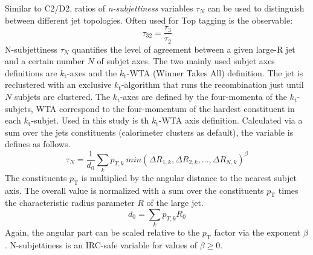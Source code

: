 Similar to C2/D2, ratios of \textit{n-subjettiness} variables $\tau_N$ can be used to distinguish between different jet topologies. Often used for Top tagging is the observable: 
\begin{equation}
\tau_{32} = \frac{\tau_3}{\tau_2}  
\end{equation} 
N-subjettiness $\tau_N$ quantifies the level of agreement between a given large-R jet and a certain number $N$ of subjet axes. The two mainly used subjet axes definitions are $k_\mathrm{t}$-axes and the $k_\mathrm{t}$-WTA (Winner Takes All) definition. The jet is reclustered with an exclusive $k_\mathrm{t}$-algorithm that runs the recombination just until $N$ subjets are clustered. The $k_\mathrm{t}$-axes are defined by the four-momenta of the $k_\mathrm{t}$-subjets, WTA correspond to the four-momentum of the hardest constituent in each $k_\mathrm{t}$-subjet. Used in this study is th $k_\mathrm{t}$-WTA axis definition. Calculated via a sum over the jets constituents (calorimeter clusters as default), the variable is defines as follows.
\begin{equation}
\tau_N = \frac{1}{d_0}\sum_k p_{T,k}\:min(\Delta R_{1,k},\Delta R_{2,k},...,\Delta R_{N,k})^{\beta}
\end{equation}
The constituents $p_{\mathrm{T}}$ is multiplied by the angular distance to the nearest subjet axis. The overall value is normalized with a sum over the constituents $p_{\mathrm{T}}$ times the characteristic radius parameter $R$ of the large jet.
\begin{equation}
d_0=\sum_k p_{T,k}R_0
\end{equation}
Again, the angular part can be scaled relative to the $p_{\mathrm{T}}$ factor via the exponent $\beta$. N-subjettiness is an IRC-safe variable for values of $\beta \ge 0$.

